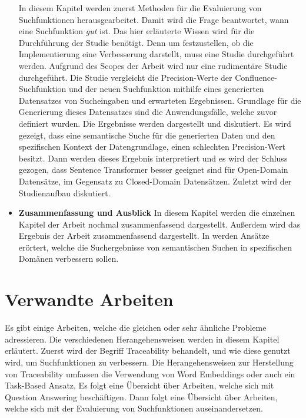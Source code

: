 \begin{itemize}
         In diesem Kapitel werden zuerst Methoden für die Evaluierung von Suchfunktionen herausgearbeitet.
         Damit wird die Frage beantwortet, wann eine Suchfunktion \textit{gut} ist.
         Das hier erläuterte Wissen wird für die Durchführung der Studie benötigt.
         Denn um festzustellen, ob die Implementierung eine Verbesserung darstellt, muss eine Studie durchgeführt werden.
         Aufgrund des Scopes der Arbeit wird nur eine rudimentäre Studie durchgeführt.
         Die Studie vergleicht die Precision-Werte der Confluence-Suchfunktion und der neuen Suchfunktion mithilfe eines generierten Datensatzes von Sucheingaben und erwarteten Ergebnissen.
         Grundlage für die Generierung dieses Datensatzes sind die Anwendungsfälle, welche zuvor definiert wurden.
         Die Ergebnisse werden dargestellt und diskutiert.
         Es wird gezeigt, dass eine semantische Suche für die generierten Daten und den spezifischen Kontext der Datengrundlage, einen schlechten Precision-Wert besitzt. 
         Dann werden dieses Ergebnis interpretiert und es wird der Schluss gezogen, dass Sentence Transformer besser geeignet sind für Open-Domain Datensätze, im Gegensatz zu Closed-Domain Datensätzen.
         Zuletzt wird der Studienaufbau diskutiert.
    \item \textbf{Zusammenfassung und Ausblick}
         In diesem Kapitel werden die einzelnen Kapitel der Arbeit nochmal zusammenfassend dargestellt.
         Außerdem wird das Ergebnis der Arbeit zusammenfassend dargestellt.
         In  werden Ansätze erörtert, welche die Suchergebnisse von semantischen Suchen in spezifischen Domänen verbessern sollen.
\end{itemize}

\section{Verwandte Arbeiten}
Es gibt einige Arbeiten, welche die gleichen oder sehr ähnliche Probleme adressieren.
Die verschiedenen Herangehensweisen werden in diesem Kapitel erläutert.
Zuerst wird der Begriff Traceability behandelt, und wie diese genutzt wird, um Suchfunktionen zu verbessern.
Die Herangehensweisen zur Herstellung von Traceability umfassen die Verwendung von Word Embeddings oder auch ein Task-Based Ansatz.
Es folgt eine Übersicht über Arbeiten, welche sich mit Question Answering beschäftigen.
Dann folgt eine Übersicht über Arbeiten, welche sich mit der Evaluierung von Suchfunktionen auseinandersetzen.\\

